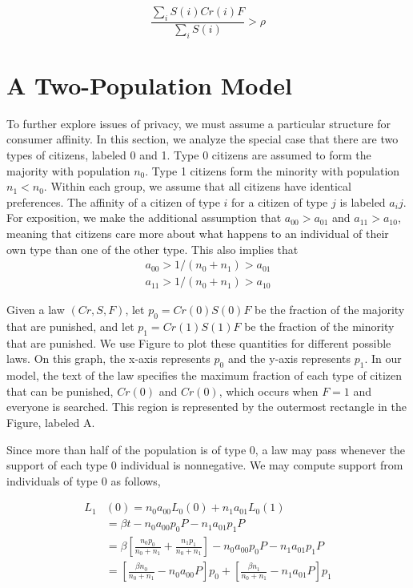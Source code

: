 $$\frac{\sum_i S(i)Cr(i)F}{\sum_i S(i)} > \rho$$




\section{A Two-Population Model}

To further explore issues of privacy, we must assume a particular structure for consumer affinity.  In this section, we analyze the special case that there are two types of citizens, labeled 0 and 1.  Type 0 citizens are assumed to form the majority with population $n_0$.  Type 1 citizens form the minority with population $n_1 < n_0$.  Within each group, we assume that all citizens have identical preferences.  The affinity of a citizen of type $i$ for a citizen of type $j$ is labeled $a_ij$.  For exposition, we make the additional assumption that $a_{00} > a_{01}$ and $a_{11} > a_{10}$, meaning that citizens care more about what happens to an individual of their own type than one of the other type.  This also implies that 
\begin{align}
a_{00} > 1/(n_0 + n_1) > a_{01} \\
a_{11} > 1/(n_0 + n_1) >  a_{10}
\end{align}

Given a law $(Cr, S, F)$, let $p_0 = Cr(0)S(0)F$ be the fraction of the majority that are punished, and let $p_1 = Cr(1)S(1)F$ be the fraction of the minority that are punished.  We use Figure  to plot these quantities for different possible laws.  On this graph, the x-axis represents $p_0$ and the y-axis represents $p_1$.  In our model, the text of the law specifies the maximum fraction of each type of citizen that can be punished, $Cr(0)$ and $Cr(0)$, which occurs when $F=1$ and everyone is searched.  This region is represented by the outermost rectangle in the Figure, labeled A.

Since more than half of the population is of type 0, a law may pass whenever the support of each type 0 individual is nonnegative.  We may compute support from individuals of type 0 as follows,

\begin{align}
L_1&(0) = n_0 a_{00}  L_0(0) + n_1 a_{01}  L_0(1) \\
&= \beta t - n_0 a_{00}p_0 P - n_1 a_{01}  p_1 P \\
&= \beta \left[ \frac{n_0 p_0}{n_0 + n_1}   + \frac{n_1 p_1}{n_0 + n_1} \right]  - n_0 a_{00}p_0 P - n_1 a_{01}  p_1 P \\
&= \left[  \frac{\beta n_0}{n_0 + n_1} - n_0 a_{00}P  \right]p_0 + \left[ \frac{\beta n_1}{n_0 + n_1} -  n_1 a_{01}P \right] p_1
\end{align}

